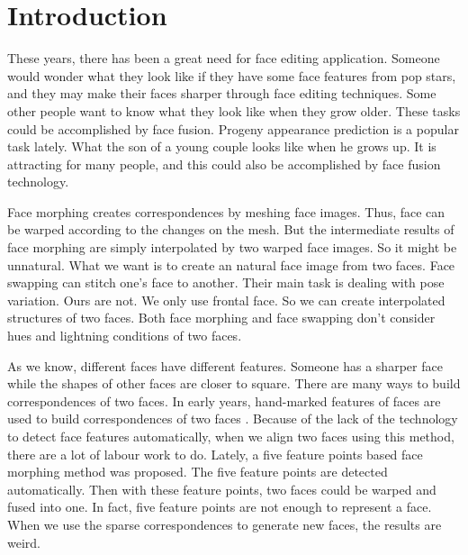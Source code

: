 \section{Introduction}





These years, there has been a great need for face editing application.
Someone would wonder what they look like if they have some face features from pop stars, and they may make their faces sharper through face editing techniques.
Some other people want to know what they look like when they grow older.
These tasks could be accomplished by face fusion.
Progeny appearance prediction is a popular task lately. What the son of a young couple looks like when he grows up. It is attracting for many people, and this could also be accomplished by face fusion technology.

Face morphing creates correspondences by meshing face images\cite{mhf,wol}. Thus, face can be warped according to the changes on  the mesh. But the intermediate results of face morphing are simply interpolated by two warped face images. So it might be unnatural. What we want is to create an natural face image from two faces. Face swapping can stitch one's face to another. Their main task is dealing with pose variation. Ours are not. We only use frontal face. So we can create interpolated structures of two faces. Both face morphing and face swapping don't consider hues and lightning conditions of two faces.

As we know, different faces have different features. Someone has a sharper face while the shapes of other faces are closer to square. There are many ways to build correspondences of two faces. In early years, hand-marked features of faces are used to build correspondences of two faces \cite{fbim}. Because of the lack of the technology to detect face features automatically, when we align two faces using this method, there are a lot of labour work to do. Lately, a five feature points based face morphing method \cite{mhf} was proposed. The five feature points are detected automatically. Then with these feature points, two faces could be warped and fused into one. In fact, five feature points are not enough to represent a face. When we use the sparse correspondences to generate new faces, the results are weird.

